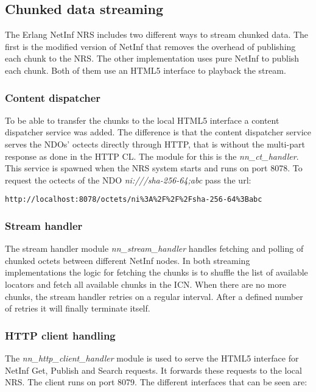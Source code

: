 \subsection{Chunked data streaming}

The Erlang NetInf NRS includes two different ways to stream chunked data. The first is the modified version of NetInf that removes the overhead of publishing each chunk to the NRS. The other implementation uses pure NetInf to publish each chunk. Both of them use an HTML5 interface to playback the stream. 


\subsubsection{Content dispatcher}

To be able to transfer the chunks to the local HTML5 interface a content dispatcher service was added. The difference is that the content dispatcher service serves the NDOs' octects directly through HTTP, that is without the multi-part response as done in the HTTP CL. The module for this is the \textit{nn\_ct\_handler}. This service is spawned when the NRS system starts and runs on port 8078. To request the octects of the NDO \textit{ni:///sha-256-64;abc} pass the url:
\begin{verbatim}
http://localhost:8078/octets/ni%3A%2F%2F%2Fsha-256-64%3Babc 
\end{verbatim}

\subsubsection{Stream handler}
The stream handler module \textit{nn\_stream\_handler} handles fetching and polling of chunked octets between different NetInf nodes.
In both streaming implementations the logic for fetching the chunks is to shuffle the list of available locators and fetch all available chunks in the ICN. When there are no more chunks, the stream handler retries on a regular interval. After a defined number of retries it will finally terminate itself.  

\subsubsection{HTTP client handling}
The \textit{nn\_http\_client\_handler} module is used to serve the HTML5 interface for NetInf Get, Publish and Search requests. It forwards these requests to the local NRS. The client runs on port 8079. The different interfaces that can be seen are:

